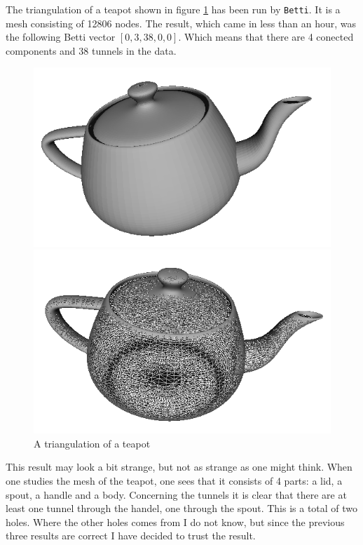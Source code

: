 \documentclass[11pt,a4paper,twoside]{report}
\begin{document}
The triangulation of a teapot shown in figure \ref{fig:teapot} has been run by \texttt{Betti}. It is a mesh consisting of 12806 nodes. The result, which came in less than an hour, was the following Betti vector $[0,3,38,0,0]$. Which means that there are 4 conected components and 38 tunnels in the data.
\begin{figure}[H]
\begin{minipage}[b]{0.45\linewidth}
\center
\includegraphics[scale=0.5]{teapot00.png}
\end{minipage}
\hspace{0.5cm}
\begin{minipage}[b]{0.45\linewidth}
\center
\includegraphics[scale=0.5]{teapot01.png}
\end{minipage}
\caption{A triangulation of a teapot}
\label{fig:teapot}
\end{figure}
This result may look a bit strange, but not as strange as one might think. When one studies the mesh of the teapot, one sees that it consists of 4 parts: a lid, a spout, a handle and a body. Concerning the tunnels it is clear that there are at least one tunnel through the handel, one through the spout. This is a total of two holes. Where the other holes comes from I do not know, but since the previous three results are correct I have decided to trust the result.
\end{document}
